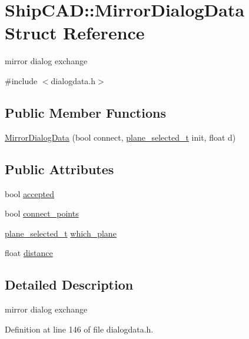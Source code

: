 \hypertarget{structShipCAD_1_1MirrorDialogData}{}\section{Ship\+C\+AD\+:\+:Mirror\+Dialog\+Data Struct Reference}
\label{structShipCAD_1_1MirrorDialogData}


mirror dialog exchange  




{\ttfamily \#include $<$dialogdata.\+h$>$}

\subsection*{Public Member Functions}
\begin{DoxyCompactItemize}
\item 
\hyperlink{structShipCAD_1_1MirrorDialogData_acda8c01f77958f1f073d496f07cd9af6}{Mirror\+Dialog\+Data} (bool connect, \hyperlink{namespaceShipCAD_aa0f3f220e102a298d2e698af90f5e1fc}{plane\+\_\+selected\+\_\+t} init, float d)
\end{DoxyCompactItemize}
\subsection*{Public Attributes}
\begin{DoxyCompactItemize}
\item 
bool \hyperlink{structShipCAD_1_1MirrorDialogData_afcb200cc96d661381d54e6ca4919a216}{accepted}
\item 
bool \hyperlink{structShipCAD_1_1MirrorDialogData_a6e3cdbe59eeedec71b5d3b56e5414516}{connect\+\_\+points}
\item 
\hyperlink{namespaceShipCAD_aa0f3f220e102a298d2e698af90f5e1fc}{plane\+\_\+selected\+\_\+t} \hyperlink{structShipCAD_1_1MirrorDialogData_a4e17198aa242bba6426a2b28840ceca5}{which\+\_\+plane}
\item 
float \hyperlink{structShipCAD_1_1MirrorDialogData_ab692a899cc809b67fd65fee10848e863}{distance}
\end{DoxyCompactItemize}


\subsection{Detailed Description}
mirror dialog exchange 

Definition at line 146 of file dialogdata.\+h.



